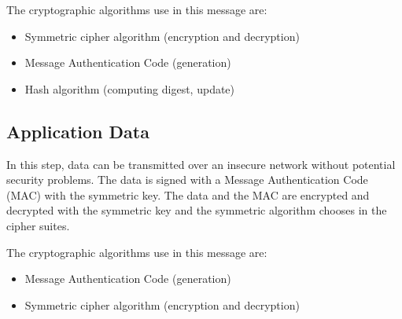 The cryptographic algorithms use in this message are:
\begin{itemize}[noitemsep]
  \item Symmetric cipher algorithm (encryption and decryption)
  \item Message Authentication Code (generation)
  \item Hash algorithm (computing digest, update)
\end{itemize}



\subsection*{Application Data}
In this step, data can be transmitted over an insecure network without potential
security problems.
The data is signed with a Message Authentication Code (MAC) with the symmetric
key.
The data and the MAC are encrypted and decrypted with the symmetric key and the
symmetric algorithm chooses in the cipher suites.

The cryptographic algorithms use in this message are:
\begin{itemize}[noitemsep]
  \item Message Authentication Code (generation)
  \item Symmetric cipher algorithm (encryption and decryption)
\end{itemize}
